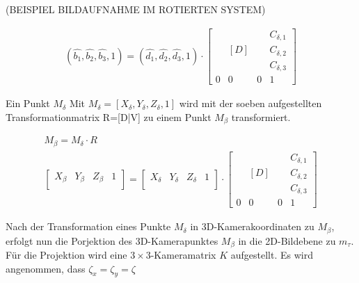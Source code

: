 (BEISPIEL BILDAUFNAHME IM ROTIERTEN SYSTEM)
 
\begin{gather} 		
(\hat{b_1}, \hat{b_2}, \hat{b_3},1)=(\hat{d_1},\hat{d_2},\hat{d_3},1) \cdot
\begin{bmatrix}
&  &  &C_{\delta,1} \\
&  [D]&  &C_{\delta,2} \\ 
&  &  &C_{\delta,3} \\
0&0&0 & 1
\end{bmatrix}	
\end{gather}

Ein Punkt $M_\delta$ Mit $M_\delta=[X_\delta,Y_\delta,Z_\delta,1]$ wird mit der soeben aufgestellten Transformationmatrix R=[D|V] zu einem Punkt $M_\beta$ transformiert.

\begin{gather}
M_\beta = M_\delta \cdot R\\
\begin{bmatrix}
X_\beta& Y_\beta& Z_\beta&1\\
\end{bmatrix} = 
\begin{bmatrix}
X_\delta& Y_\delta& Z_\delta&1\\
\end{bmatrix} \cdot
\begin{bmatrix}
	&  &  &C_{\delta,1} \\
	&  [D]&  &C_{\delta,2} \\ 
	&  &  &C_{\delta,3} \\
	0&0&0 & 1
\end{bmatrix}	
\end{gather}


Nach der Transformation eines Punkte $M_\delta$ in 3D-Kamerakoordinaten zu $M_\beta$, erfolgt nun die Porjektion des 3D-Kamerapunktes $M_\beta$ in die 2D-Bildebene zu $m_\tau$. Für die Projektion wird eine $3 \times 3$-Kameramatrix $K$ aufgestellt.  Es wird angenommen, dass $\zeta_x = \zeta_y =\zeta$

